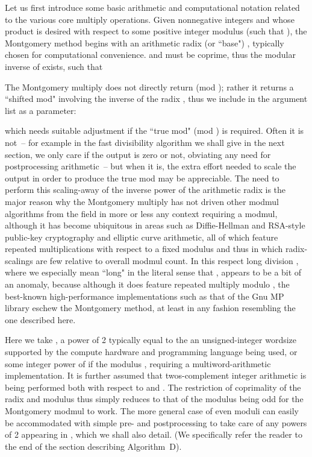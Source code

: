 \documentclass{article}
\begin{document}
Let us first introduce some basic arithmetic and computational notation related to the various core multiply operations. Given nonnegative integers  and  whose product is desired with respect to some positive integer modulus  (such that ), the Montgomery method begins with an arithmetic radix (or ``base") , typically chosen for computational convenience.  and  must be coprime, thus the modular inverse  of  exists, such that

The Montgomery multiply does not directly return  (mod ); rather it returns a ``shifted mod" involving the inverse of the radix , thus we include  in the argument list as a parameter:

which needs suitable adjustment if the ``true mod"  (mod ) is required. Often it is not~-- for example in the fast divisibility algorithm we shall give in the next section, we only care if the output is zero or not, obviating any need for postprocessing arithmetic~-- but when it is, the extra effort needed to scale the output in order to produce the true mod may be appreciable. The need to perform this scaling-away of the inverse power of the arithmetic radix is the major reason why the Montgomery multiply has not driven other modmul algorithms from the field in more or less any context requiring a modmul, although it has become ubiquitous in areas such as Diffie-Hellman and RSA-style public-key cryptography and elliptic curve arithmetic, all of which feature repeated multiplications with respect to a fixed modulus and thus in which radix-scalings are few relative to overall modmul count. In this respect long division , where we especially mean ``long" in the literal sense that , appears to be a bit of an anomaly, because although it does feature repeated multiply modulo , the best-known high-performance implementations such as that of the Gnu MP library \cite{GMP} eschew the Montgomery method, at least in any fashion resembling the one described here.

Here we take , a power of 2 typically equal to the an unsigned-integer wordsize  supported by the compute hardware and programming language being used, or some integer power of  if the modulus , requiring a multiword-arithmetic implementation. It is further assumed that twos-complement integer arithmetic is being performed both with respect to  and . The restriction of coprimality of the radix and modulus thus simply reduces to that of the modulus  being odd for the Montgomery modmul to work. The more general case of even moduli can easily be accommodated with simple pre- and postprocessing to take care of any powers of 2 appearing in , which we shall also detail. (We specifically refer the reader to the end of the section describing Algorithm~D).
\end{document}
